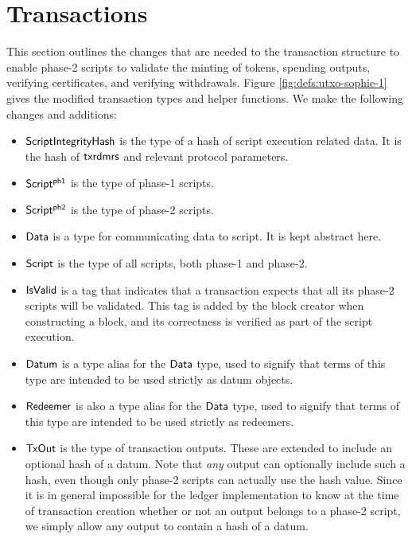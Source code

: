 \section{Transactions}
\label{sec:transactions}

This section outlines the changes that are needed to the transaction
structure to enable phase-2 scripts to validate
the minting of tokens, spending outputs, verifying certificates, and
verifying withdrawals.
%
Figure \ref{fig:defs:utxo-sophie-1} gives the modified transaction types and helper functions.
We make the following changes and additions:

\begin{itemize}
  \item $\mathsf{ScriptIntegrityHash}$ is the type of a hash of script execution
  related data. It is the hash of $\mathsf{txrdmrs}$ and relevant protocol parameters.

  \item $\mathsf{Script^{ph1}}$ is the type of phase-1 scripts.

  \item $\mathsf{Script^{ph2}}$ is the type of phase-2 scripts.

  \item $\mathsf{Data}$ is a type for communicating data to script.  It is kept abstract here.

  \item $\mathsf{Script}$ is the type of all scripts, both phase-1 and phase-2.

  \item $\mathsf{IsValid}$ is a tag that indicates that a transaction
  expects that all its phase-2 scripts will be validated.
  This tag is added by the block creator when
  constructing a block, and its correctness is verified as part of the script execution.

  \item $\mathsf{Datum}$ is a type alias for the $\mathsf{Data}$ type, used to signify that
  terms of this type are intended to be used strictly as datum objects.

  \item $\mathsf{Redeemer}$ is also a type alias for the $\mathsf{Data}$ type, used to signify that
  terms of this type are intended to be used strictly as redeemers.

  \item $\mathsf{TxOut}$ is the type of transaction outputs. These are extended to include
  an optional hash of a datum. Note that \emph{any} output can
  optionally include such a hash, even though only phase-2 scripts
  can actually use the hash value. Since it is in general impossible for the ledger implementation to
  know at the time of transaction creation whether or not an output belongs to a phase-2
  script, we simply allow any output to contain a hash of a datum.


\end{itemize}
